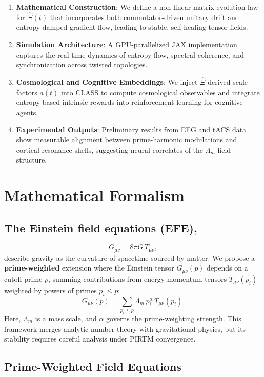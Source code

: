 \documentclass{article}
\theoremstyle{plain}
\theoremstyle{claimstyle}
\begin{document}
\begin{enumerate}
    \item \textbf{Mathematical Construction}: We define a non-linear matrix evolution law for $\hat{\Xi}(t)$ that incorporates both commutator-driven unitary drift and entropy-damped gradient flow, leading to stable, self-healing tensor fields.
    
    \item \textbf{Simulation Architecture}: A GPU-parallelized JAX implementation captures the real-time dynamics of entropy flow, spectral coherence, and synchronization across twisted topologies.
    
    \item \textbf{Cosmological and Cognitive Embeddings}: We inject $\hat{\Xi}$-derived scale factors $a(t)$ into CLASS to compute cosmological observables and integrate entropy-based intrinsic rewards into reinforcement learning for cognitive agents.
    
    \item \textbf{Experimental Outputs}: Preliminary results from EEG and tACS data show measurable alignment between prime-harmonic modulations and cortical resonance shells, suggesting neural correlates of the $\Lambda_m$-field structure.
\end{enumerate}


\section{Mathematical Formalism}
\subsection{The Einstein field equations (EFE),}
\[
G_{\mu\nu} = 8\pi G \, T_{\mu\nu},
\]
describe gravity as the curvature of spacetime sourced by matter. We propose a \textbf{prime-weighted} extension where the Einstein tensor \( G_{\mu\nu}(p) \) depends on a cutoff prime \( p \), summing contributions from energy-momentum tensors \( T_{\mu\nu}(p_i) \) weighted by powers of primes \( p_i \leq p \):
\[
G_{\mu\nu}(p) = \sum_{p_i \leq p} \Lambda_m \, p_i^\alpha \, T_{\mu\nu}(p_i).
\]
Here, \( \Lambda_m \) is a mass scale, and \( \alpha \) governs the prime-weighting strength. This framework merges analytic number theory with gravitational physics, but its stability requires careful analysis under PIRTM convergence.

\subsection{Prime-Weighted Field Equations}
\end{document}
